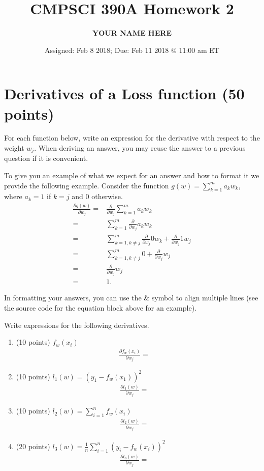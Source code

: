 \documentclass{article}
\title{CMPSCI 390A Homework 2}
\author{\textbf{YOUR NAME HERE}}
\date{Assigned: Feb 8 2018; Due: Feb 11 2018 @ 11:00 am ET}
\begin{document}
\maketitle


\section{Derivatives of a Loss function (50 points)}

For each function below, write an expression for the derivative with respect to the weight $w_j$. When deriving an answer, you may reuse the answer to a previous question if it is convenient. 


To give you an example of what we expect for an answer and how to format it we provide the following example. 
%
Consider the function $g(w) = \sum_{k=1}^m a_k w_k$, where $a_k = 1$ if $k=j$ and $0$ otherwise. 
\begin{align}
    \frac{\partial g(w)}{\partial w_j} = & \frac{\partial}{\partial w_j} \sum_{k=1}^m a_k w_k \\
    = & \sum_{k=1}^m \frac{\partial}{\partial w_j} a_k w_k \\
    = & \sum_{k=1, k \ne j}^m \frac{\partial}{\partial w_j} 0 w_k + \frac{\partial}{\partial w_j} 1 w_j \\
    = & \sum_{k=1, k \ne j}^m 0 + \frac{\partial}{\partial w_j} w_j \\
    = & \frac{\partial}{\partial w_j} w_j \\
    = &  1.
\end{align}

In formatting your answers, you can use the {\&} symbol to align multiple lines (see the source code for the equation block above for an example). 



Write expressions for the following derivatives. 
\begin{enumerate}
    \item (10 points) $f_w(x_i)$
    \begin{align}
        \frac{\partial f_w(x_i)}{\partial w_j} = &\ %
    \end{align}
    
    \item (10 points)  $l_1(w) = (y_1 - f_w(x_1))^2$
    \begin{align}
        \frac{\partial l_1(w)}{\partial w_j} = &\ %
    \end{align}
    
    \item (10 points) $l_2(w) = \sum_{i=1}^n f_w(x_i)$
    \begin{align}
        \frac{\partial l_2(w)}{\partial w_j} = &\ %
    \end{align}
    
    \item (20 points) $l_3(w) = \frac{1}{n}\sum_{i=1}^n (y_i - f_w(x_i))^2$
    \begin{align}
        \frac{\partial l_3(w)}{\partial w_j} = &\ %
    \end{align}
    
\end{enumerate}
\end{document}
